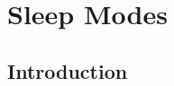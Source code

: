 \chapter{Sleep Modes}\label{avr-sleep-modes}

\section{Introduction}\label{avr-sleep-modes-introduction}
